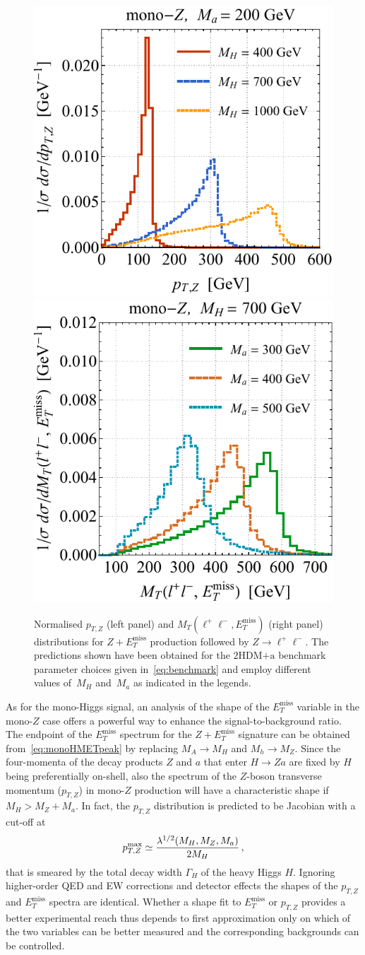 \documentclass[a4paper, 11pt,notoc]{article}
\newcommand{\MET}{\ensuremath{E_T^\mathrm{miss}}\xspace}
\newcommand{\hdma}{\ensuremath{\textrm{2HDM+a}}\xspace}
\begin{document}
\begin{figure}[t!]
\centering
\includegraphics[height=0.45\textwidth]{ptzspec.pdf}	\qquad 
\includegraphics[height=0.45\textwidth]{mtspec.pdf}
\vspace{2mm}
\caption{\label{fig:zptmt} Normalised $p_{T,Z}$ (left panel) and $M_T (\ell^+ \ell^-, \MET)$ (right panel) distributions for $Z + \MET$ production followed by $Z \to \ell^+ \ell^-$. The  predictions shown have been obtained for the \hdma benchmark parameter choices  given in~\eqref{eq:benchmark} and employ different values of~$M_H$ and~$M_a$ as indicated in the legends.}
\end{figure}

As for the mono-Higgs signal, an analysis of the shape of the $\MET$ variable in the mono-$Z$ case offers a powerful way to enhance the signal-to-background ratio. The endpoint of the $\MET$ spectrum for the $Z+\MET$ signature can be obtained from~\eqref{eq:monoHMETpeak} by  replacing $M_A \to M_H$ and $M_h \to M_Z$.  Since the four-momenta of the decay products $Z$ and $a$ that enter $H \to Za$ are fixed by $H$ being preferentially on-shell, also the spectrum of the $Z$-boson transverse momentum ($p_{T,Z}$) in mono-$Z$ production will have a characteristic shape if $M_H > M_Z + M_a$.   In fact,  the $p_{T,Z}$ distribution is predicted  to be Jacobian with a cut-off at~\cite{No:2015xqa,Bauer:2017ota}
\begin{equation} \label{eq:monoZpTpeak}
p_{T,Z}^{ {\rm max} } \simeq \frac{\lambda^{1/2}(M_H, M_Z, M_a)}{2 M_H}\,,
\end{equation}
that is smeared by the total decay width $\Gamma_H$ of the heavy Higgs $H$. Ignoring higher-order QED and EW corrections and detector effects the shapes of the $p_{T,Z}$ and $\MET$ spectra are identical. Whether a shape fit to $\MET$ or $p_{T,Z}$ provides a better experimental reach thus depends to first approximation only on which of the two variables can be better measured and the corresponding backgrounds can be controlled.
\end{document}
